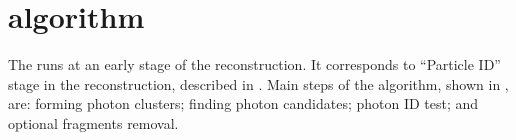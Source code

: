 



\section{\PhotonReconstruction algorithm}
\label{sec:photonRecostrcution}


The \PhotonReconstruction runs at an early stage of the reconstruction. It corresponds to ``Particle ID'' stage in the \pandora reconstruction, described in .  Main steps of the \PhotonReconstruction algorithm, shown in , are:  forming photon clusters; finding photon candidates; photon ID test; and optional fragments removal.


